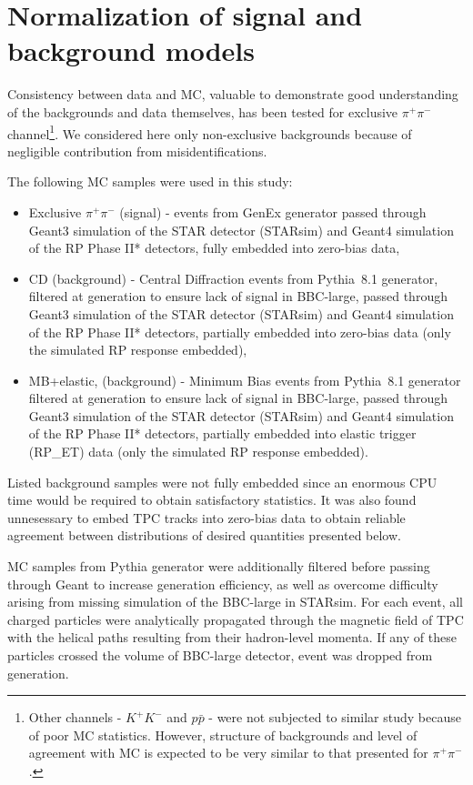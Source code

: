 \section{Normalization of signal and background models}\label{sec:bkgdSignalNorm}


Consistency between data and MC, valuable to demonstrate good understanding of the backgrounds and data themselves, has been tested for exclusive $\pi^{+}\pi^{-}$ channel\footnote{Other channels - $K^{+}K^{-}$ and $p\bar{p}$ - were not subjected to similar study because of poor MC statistics. However, structure of backgrounds and level of agreement with MC is expected to be very similar to that presented for $\pi^{+}\pi^{-}$.}. We considered here only non-exclusive backgrounds because of negligible contribution from misidentifications.

The following MC samples were used in this study:
\begin{itemize}
 \item Exclusive $\pi^{+}\pi^{-}$ (signal) - events from GenEx\cite{GenEx} generator passed through Geant3 simulation of the STAR detector (STARsim) and Geant4 simulation of the RP Phase II* detectors, fully embedded into zero-bias data,
 \item CD (background) - Central Diffraction events from Pythia~8.1 generator, filtered at generation to ensure lack of signal in BBC-large, passed through Geant3 simulation of the STAR detector (STARsim) and Geant4 simulation of the RP Phase II* detectors, partially embedded into zero-bias data (only the simulated RP response embedded),
 \item MB+elastic, (background) - Minimum Bias events from Pythia~8.1 generator filtered at generation to ensure lack of signal in BBC-large, passed through Geant3 simulation of the STAR detector (STARsim) and Geant4 simulation of the RP Phase II* detectors, partially embedded into elastic trigger (RP\_ET) data (only the simulated RP response embedded).
\end{itemize}

Listed background samples were not fully embedded since an enormous CPU time would be required to obtain satisfactory statistics. It was also found unnesessary to embed TPC tracks into zero-bias data to obtain reliable agreement between distributions of desired quantities presented below.

MC samples from Pythia generator were additionally filtered before passing through Geant to increase generation efficiency, as well as overcome difficulty arising from missing simulation of the BBC-large in STARsim. For each event, all charged particles were analytically propagated through the magnetic field of TPC with the helical paths resulting from their hadron-level momenta. If any of these particles crossed the volume of BBC-large detector, event was dropped from generation.

